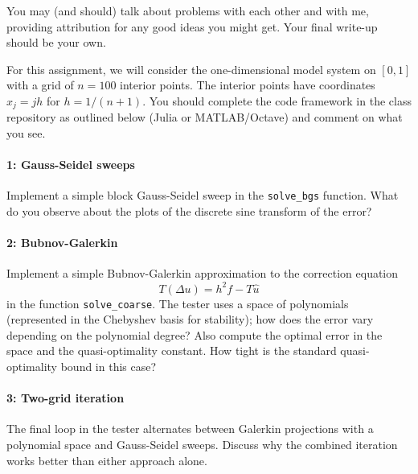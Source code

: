 \documentclass[12pt, leqno]{article} %
\begin{document}

You may (and should) talk about problems with each other and with me,
providing attribution for any good ideas you might get.  Your final
write-up should be your own.


For this assignment, we will consider the one-dimensional model
system on $[0,1]$ with a grid of $n = 100$ interior points.
The interior points have coordinates $x_j = jh$ for $h = 1/(n+1)$.
You should complete the code framework in the class repository
as outlined below (Julia or MATLAB/Octave) and comment on what
you see.

\paragraph*{1: Gauss-Seidel sweeps}
Implement a simple block Gauss-Seidel sweep in the {\tt solve\_bgs}
function.  What do you observe about the plots of the discrete sine
transform of the error?

\paragraph*{2: Bubnov-Galerkin}
Implement a simple Bubnov-Galerkin approximation to the correction
equation
\[
  T (\Delta u) = h^2 f - T \hat{u}
\]
in the function {\tt solve\_coarse}.  The tester uses a space of
polynomials (represented in the Chebyshev basis for stability);
how does the error vary depending on the polynomial degree?
Also compute the optimal error in the space and the quasi-optimality
constant.  How tight is the standard quasi-optimality bound in
this case?

\paragraph*{3: Two-grid iteration}
The final loop in the tester alternates between Galerkin projections
with a polynomial space and Gauss-Seidel sweeps.  Discuss why
the combined iteration works better than either approach alone.
\end{document}
